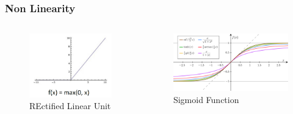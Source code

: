 \documentclass{ctexbeamer}
\begin{document}
\begin{frame}
  \frametitle{Non Linearity}
  \begin{columns}[T]
    \begin{column}{0.5\textwidth}
      \begin{figure}[H]
        \raggedright
        \includegraphics[width=\textwidth]{./figures/ReLu.png}
        \caption{REctified Linear Unit}
        \label{fig:relu}
      \end{figure}
    \end{column}
    \begin{column}{0.5\textwidth}
      \begin{figure}[H]
        \raggedleft
        \includegraphics[width=\textwidth]{./figures/sigmoid.png}
        \caption{Sigmoid Function}
        \label{fig:sigmoid}
      \end{figure}
    \end{column}
  \end{columns}
\end{frame}
\end{document}
